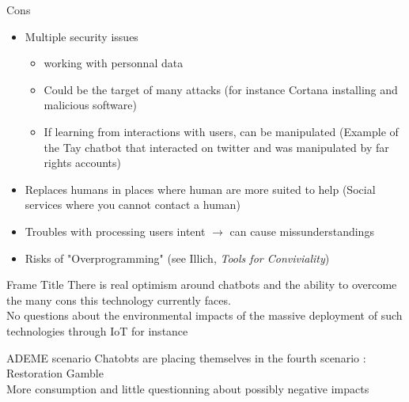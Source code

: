\documentclass[11pt, aspectratio=169,]{beamer}
\begin{document}
\begin{frame}{Cons}
    \begin{itemize}
        \item Multiple security issues
        \begin{itemize}
            \item working with personnal data
            \item Could be the target of many attacks (for instance Cortana installing and  malicious software)
            \item If learning from interactions with users, can be manipulated (Example of the Tay chatbot that interacted on twitter and was manipulated by far rights accounts)
        \end{itemize}
        \item Replaces humans in places where human are more suited to help (Social services where you cannot contact a human)
        \item Troubles with processing users intent $\rightarrow$ can cause missunderstandings
        \item Risks of "Overprogramming" (see Illich, \emph{Tools for Conviviality})
    \end{itemize}
\end{frame}

\begin{frame}{Frame Title}
    There is real optimism around chatbots and the ability to overcome the many cons this technology currently faces. \\
    No questions about the environmental impacts of the massive deployment of such technologies through IoT for instance
    \begin{block}{ADEME scenario}
    Chatobts are placing themselves in the fourth scenario : Restoration Gamble \\
    More consumption and little questionning about possibly negative impacts
    \end{block}
\end{frame}
\end{document}
